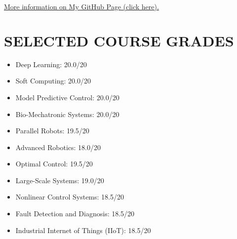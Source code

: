 \documentclass[11pt,a4paper,sans]{moderncv} %
\begin{document}
   \vspace{1em}
	\centerline{{{	\faGithub  \hspace{0.5 pt} \href{https://github.com/MJAHMADEE}{More information on My GitHub Page (click here).}}}}

 \section{SELECTED COURSE GRADES}
	
\begin{cvcolumns}
    {
        \begin{itemize}
            \item \href{https://ut.ac.ir/en}{} Deep Learning: 20.0/20
            \item \href{https://en.kntu.ac.ir/}{} Soft Computing: 20.0/20
            \item \href{https://en.kntu.ac.ir/}{} Model Predictive Control: 20.0/20
            \item \href{https://en.kntu.ac.ir/}{} Bio-Mechatronic Systems: 20.0/20
            \item \href{https://en.kntu.ac.ir/}{} Parallel Robots: 19.5/20
            \item \href{https://aut.ac.ir/en}{} Advanced Robotics: 18.0/20
            \item \href{https://en.kntu.ac.ir/}{} Optimal Control: 19.5/20
            \item \href{https://en.kntu.ac.ir/}{} Large-Scale Systems: 19.0/20
            \item \href{https://en.kntu.ac.ir/}{} Nonlinear Control Systems: 18.5/20
            \item \href{https://en.kntu.ac.ir/}{} Fault Detection and Diagnosis: 18.5/20
            \item \href{https://aut.ac.ir/en}{} Industrial Internet of Things (IIoT): 18.5/20
        \end{itemize}
    }
    

\end{cvcolumns}
\end{document}
